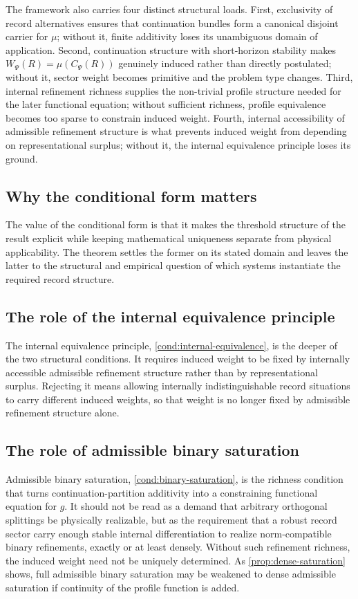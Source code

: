 \documentclass[11pt]{article}
\theoremstyle{remark}
\numberwithin{equation}{section}
\begin{document}
The framework also carries four distinct structural loads. First,
exclusivity of record alternatives ensures that continuation bundles
form a canonical disjoint carrier for $\mu$; without it, finite
additivity loses its unambiguous domain of application. Second,
continuation structure with short-horizon stability makes
$W_\Psi(R)=\mu(C_\Psi(R))$ genuinely induced rather than directly
postulated; without it, sector weight becomes primitive and the
problem type changes. Third, internal refinement richness supplies the
non-trivial profile structure needed for the later functional
equation; without sufficient richness, profile equivalence becomes too
sparse to constrain induced weight. Fourth, internal accessibility of
admissible refinement structure is what prevents induced weight from
depending on representational surplus; without it, the internal
equivalence principle loses its ground.

\subsection{Why the conditional form matters}

The value of the conditional form is that it makes the threshold
structure of the result explicit while keeping mathematical
uniqueness separate from physical applicability. The theorem settles
the former on its stated domain and leaves the latter to the
structural and empirical question of which systems instantiate the
required record structure.

\subsection{The role of the internal equivalence principle}

The internal equivalence principle, \cref{cond:internal-equivalence},
is the deeper of the two structural conditions. It requires induced
weight to be fixed by internally accessible admissible refinement
structure rather than by representational surplus. Rejecting it means
allowing internally indistinguishable record situations to carry
different induced weights, so that weight is no longer fixed by
admissible refinement structure alone.

\subsection{The role of admissible binary saturation}

Admissible binary saturation, \cref{cond:binary-saturation}, is the
richness condition that turns continuation-partition additivity into a
constraining functional equation for \(g\). It should not be read as a
demand that arbitrary orthogonal splittings be physically realizable,
but as the requirement that a robust record sector carry enough stable
internal differentiation to realize norm-compatible binary
refinements, exactly or at least densely. Without such refinement
richness, the induced weight need not be uniquely determined. As
\cref{prop:dense-saturation} shows, full admissible binary saturation
may be weakened to dense admissible saturation if continuity of the
profile function is added.
\end{document}
